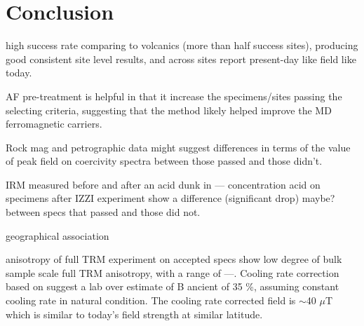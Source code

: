 \documentclass[draft]{agujournal2019}
\begin{document}







\section*{Conclusion}
high success rate comparing to volcanics (more than half success sites), producing good consistent site level results, and across sites report present-day like field like today.

AF pre-treatment is helpful in that it increase the specimens/sites passing the selecting criteria, suggesting that the method likely helped improve the MD ferromagnetic carriers. 

Rock mag and petrographic data might suggest differences in terms of the value of peak field on coercivity spectra between those passed and those didn't.  

IRM measured before and after an acid dunk in --- concentration acid on specimens after IZZI experiment show a difference (significant drop) maybe? between specs that passed and those did not.

geographical association

anisotropy of full TRM experiment on accepted specs show low degree of bulk sample scale full TRM anisotropy, with a range of ---. Cooling rate correction based on \cite{Halgedahl1980a} suggest a lab over estimate of B ancient of 35 \%, assuming constant cooling rate in natural condition. The cooling rate corrected field is $\sim$40 $\mu$T which is similar to today's field strength at similar latitude. 
\end{document}
